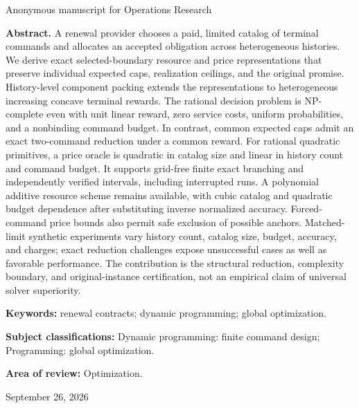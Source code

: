 \documentclass[11pt,letterpaper]{article}
\theoremstyle{definition}\newtheorem{remark}[theorem]{Remark}
\begin{document}
\hypersetup{pageanchor=false}
\begin{titlepage}
\vspace{0.25in}Anonymous manuscript for Operations Research\par\vspace{0.2in}
\begin{minipage}{\textwidth}\textbf{Abstract.} A renewal provider chooses a paid, limited catalog of terminal commands and allocates an accepted obligation across heterogeneous histories. We derive exact selected-boundary resource and price representations that preserve individual expected caps, realization ceilings, and the original promise. History-level component packing extends the representations to heterogeneous increasing concave terminal rewards. The rational decision problem is NP-complete even with unit linear reward, zero service costs, uniform probabilities, and a nonbinding command budget. In contrast, common expected caps admit an exact two-command reduction under a common reward. For rational quadratic primitives, a price oracle is quadratic in catalog size and linear in history count and command budget. It supports grid-free finite exact branching and independently verified intervals, including interrupted runs. A polynomial additive resource scheme remains available, with cubic catalog and quadratic budget dependence after substituting inverse normalized accuracy. Forced-command price bounds also permit safe exclusion of possible anchors. Matched-limit synthetic experiments vary history count, catalog size, budget, accuracy, and charges; exact reduction challenges expose unsuccessful cases as well as favorable performance. The contribution is the structural reduction, complexity boundary, and original-instance certification, not an empirical claim of universal solver superiority.
\par\vspace{0.15in}\textbf{Keywords:} renewal contracts; dynamic programming; global optimization.
\par\vspace{0.1in}\textbf{Subject classifications:} Dynamic programming: finite command design; Programming: global optimization.
\par\vspace{0.1in}\textbf{Area of review:} Optimization.\end{minipage}\vfill September 26, 2026\end{titlepage}
\end{document}

